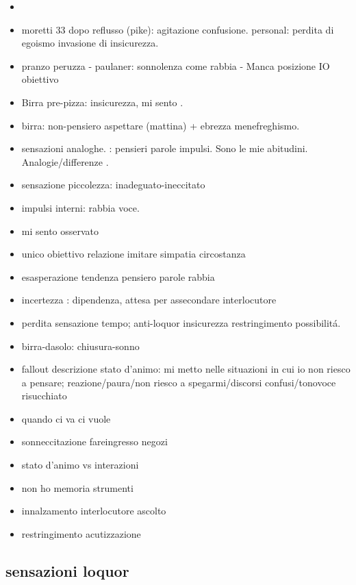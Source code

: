 \begin{itemize}
\item {}
\item moretti 33 dopo reflusso (pike): agitazione confusione. personal: perdita di egoismo invasione di insicurezza.
\item pranzo peruzza - paulaner: sonnolenza  come rabbia - Manca posizione IO obiettivo
\item Birra pre-pizza:   insicurezza, mi sento .
\item birra: non-pensiero aspettare (mattina) + ebrezza menefreghismo. 
\item {} sensazioni analoghe. : pensieri parole impulsi. Sono le mie abitudini. Analogie/differenze .
\item sensazione piccolezza: inadeguato-ineccitato
\item impulsi interni: rabbia voce.
\item mi sento osservato
\item unico obiettivo relazione imitare simpatia circostanza
\item esasperazione tendenza pensiero parole rabbia
\item incertezza : dipendenza, attesa per assecondare interlocutore
\item perdita sensazione tempo; anti-loquor insicurezza restringimento possibilit\'a.
\item birra-dasolo: chiusura-sonno
\item fallout descrizione stato d'animo: mi metto nelle situazioni in cui io non riesco a pensare; reazione/paura/non riesco a spegarmi/discorsi confusi/tonovoce risucchiato
\item quando ci va ci vuole
\item sonneccitazione fareingresso negozi
\item stato d'animo vs interazioni
\item non ho memoria strumenti
\item innalzamento interlocutore ascolto
\item restringimento acutizzazione
\end{itemize}

\subsection{sensazioni loquor}

